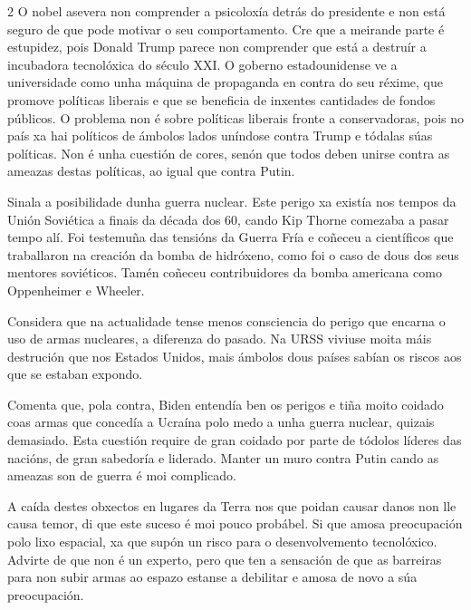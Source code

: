 \begin{multicols}{2}
O nobel asevera non comprender a psicoloxía detrás do presidente e non está
seguro de que pode motivar o seu comportamento. Cre que a meirande parte é
estupidez, pois Donald Trump parece non comprender que está a destruír a
incubadora tecnolóxica do século XXI. O goberno estadounidense ve a
universidade como unha máquina de propaganda en contra do seu réxime, que
promove políticas liberais e que se beneficia de inxentes cantidades de fondos
públicos. O problema non é sobre políticas liberais fronte a conservadoras,
pois no país xa hai políticos de ámbolos lados uníndose contra Trump e tódalas
súas políticas. Non é unha cuestión de cores, senón que todos deben unirse
contra as ameazas destas políticas, ao igual que contra Putin.


Sinala a posibilidade dunha guerra nuclear. Este perigo xa existía nos tempos
da Unión Soviética a finais da década dos 60, cando Kip Thorne comezaba a pasar
tempo alí. Foi testemuña das tensións da Guerra Fría e coñeceu a científicos
que traballaron na creación da bomba de hidróxeno, como foi o caso de dous dos
seus mentores soviéticos. Tamén coñeceu contribuidores da bomba americana como
Oppenheimer e Wheeler.

Considera que na actualidade tense menos consciencia do perigo que encarna o
uso de armas nucleares, a diferenza do pasado. Na URSS viviuse moita máis
destrución que nos Estados Unidos, mais ámbolos dous países sabían os riscos
aos que se estaban expondo.

Comenta que, pola contra, Biden entendía ben os perigos e tiña moito coidado
coas armas que concedía a Ucraína polo medo a unha guerra nuclear, quizais
demasiado. Esta cuestión require de gran coidado por parte de tódolos líderes
das nacións, de gran sabedoría e liderado. Manter un muro contra Putin cando as
ameazas son de guerra é moi complicado.


A caída destes obxectos en lugares da Terra nos que poidan causar danos non lle
causa temor, di que este suceso é moi pouco probábel. Si que amosa preocupación
polo lixo espacial, xa que supón un risco para o desenvolvemento tecnolóxico.
Advirte de que non é un experto, pero que ten a sensación de que as barreiras
para non subir armas ao espazo estanse a debilitar e amosa de novo a súa
preocupación.


\end{multicols}
